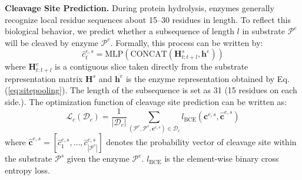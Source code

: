 \textbf{Cleavage Site Prediction.}  
 During protein hydrolysis, enzymes generally recognize local residue sequences about 15–30 residues in length. To reflect this biological behavior, we predict whether a subsequence of length $l$ in substrate $\mathcal{P}^e$ will be cleaved by enzyme $\mathcal{P}^e$. Formally, this process can be written by:
\begin{equation}
    \hat{c}_t^{e,s} = \mathrm{MLP}(\mathrm{CONCAT}(\mathbf{H}_{t:t+l}^s, \mathbf{h}^e))
    \label{eq:1DCNN}
\end{equation}
where $\mathbf{H}_{t:t+l}^e$ is a contiguous slice taken directly from the substrate representation matrix $\mathbf{H}^s$ and $\mathbf{h}^e$ is the enzyme representation obtained by Eq.(\ref{eq:sitepooling}). The length of the subsequence is set as 31 (15 residues on each side.). The optimization function of cleavage site prediction can be written as:
\begin{equation}
    \mathcal{L}_c(\mathcal{D}_c) = \frac{1}{|\mathcal{D}_c|} \sum_{(\mathcal{P}^e, \mathcal{P}^s, \mathbf{c}^{e,s}) \in \mathcal{D}_c } l_{\mathrm{BCE}}(\mathbf{c}^{e,s}, \mathbf{\hat c}^{e,s})
    \label{eq:cleavageloss}
\end{equation}
where $\mathbf{\hat c}^{e,s}=[\hat{c}_1^{e,s},\dots ,\hat{c}_{|\mathcal{P}^s|}^{e,s}]$ denotes the probability vector of cleavage site within the substrate $\mathcal{P}^s$ given the enzyme $\mathcal{P}^e$. $l_{\mathrm{BCE}}$ is the element-wise binary cross entropy loss.








